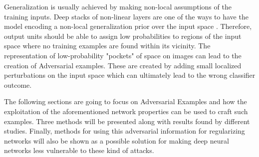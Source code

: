Generalization is usually achieved by making non-local assumptions of the training inputs. Deep stacks of non-linear layers are one of the ways to have the model encoding a non-local generalization prior over the input space \cite{gu2014}. Therefore, output units should be able to assign low probabilities to regions of the input space where no training examples are found within its vicinity. The representation of low-probability "pockets" of space on images can lead to the creation of Adversarial examples. These are created by adding small localized perturbations on the input space which can ultimately lead to the wrong classifier outcome. 


The following sections are going to focus on Adversarial Examples and how the exploitation of the aforementioned network properties can be used to craft such examples. Three methods will be presented along with results found by different studies. Finally, methods for using this adversarial information for regularizing networks will also be shown as a possible solution for making deep neural networks less vulnerable to these kind of attacks.
